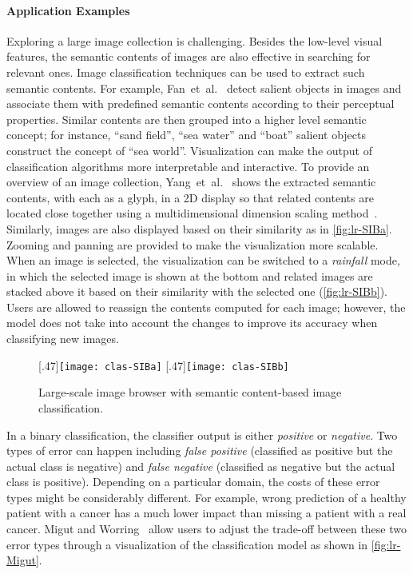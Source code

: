 \paragraph{Application Examples}
Exploring a large image collection is challenging. Besides the low-level visual features, the semantic contents of images are also effective in searching for relevant ones. Image classification techniques can be used to extract such semantic contents. For example, Fan~et~al.~\cite{Fan2004} detect salient objects in images and associate them with predefined semantic contents according to their perceptual properties. Similar contents are then grouped into a higher level semantic concept; for instance, ``sand field'', ``sea water'' and ``boat'' salient objects construct the concept of ``sea world''. Visualization can make the output of classification algorithms more interpretable and interactive. To provide an overview of an image collection, Yang~et~al.~\cite{Yang2006} shows the extracted semantic contents, with each as a glyph, in a 2D display so that related contents are located close together using a multidimensional dimension scaling method~\cite{Borg2005}. Similarly, images are also displayed based on their similarity as in \autoref{fig:lr-SIBa}. Zooming and panning are provided to make the visualization more scalable. When an image is selected, the visualization can be switched to a \emph{rainfall} mode, in which the selected image is shown at the bottom and related images are stacked above it based on their similarity with the selected one (\autoref{fig:lr-SIBb}). Users are allowed to reassign the contents computed for each image; however, the model does not take into account the changes to improve its accuracy when classifying new images.

\begin{figure}
\centering
{}[.47\columnwidth]{\texttt{[image: clas-SIBa]}}
\hfill
{}[.47\columnwidth]{\texttt{[image: clas-SIBb]}}
\label{fig:lr-SIB}
\caption[Large-scale image browser using classification]{Large-scale image browser with semantic content-based image classification. }
\end{figure}

In a binary classification, the classifier output is either \emph{positive} or \emph{negative}. Two types of error can happen including \emph{false positive} (classified as positive but the actual class is negative) and \emph{false negative} (classified as negative but the actual class is positive). Depending on a particular domain, the costs of these error types might be considerably different. For example, wrong prediction of a healthy patient with a cancer has a much lower impact than missing a patient with a real cancer. Migut and Worring~\cite{Migut2010} allow users to adjust the trade-off between these two error types through a visualization of the classification model as shown in \autoref{fig:lr-Migut}.

